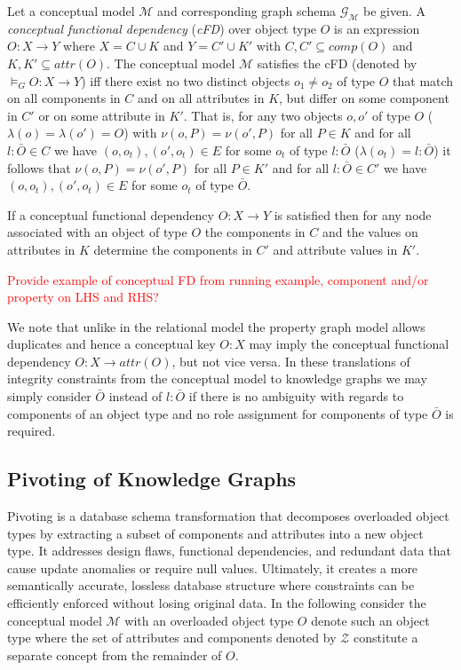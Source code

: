 \documentclass[sigconf]{acmart}
\begin{document}
\begin{definition}\label{def:cFD}
	 Let a conceptual model $\mathcal{M}$ and corresponding graph schema $\mathcal{G}_\mathcal{M}$ be given. A \emph{conceptual functional dependency} (\emph{cFD}) over object type $O$ is an expression $O : X \rightarrow Y$ where $X = C \cup K$ and $Y = C' \cup K'$ with $C,C'\subseteq comp(O)$ and $K,K'\subseteq attr(O)$. The conceptual model $\mathcal{M}$ satisfies the cFD (denoted by $\models_G O : X \rightarrow Y$) iff there exist no two distinct objects $o_1 \neq o_2$ of type $O$ that match on all components in $C$ and on all attributes in $K$, but differ on some component in $C'$ or on some attribute in $K'$. That is, for any two objects $o,o'$ of type $O$ ($\lambda(o) = \lambda(o') = O$) with $\nu(o,P) = \nu(o',P)$ for all $P \in K$ and for all $l:\bar{O} \in C$ we have $(o, o_t), (o', o_t) \in E$ for some $o_t$ of type $l:\bar{O}$ ($\lambda(o_t) = l:\bar{O}$) it follows that $\nu(o,P) = \nu(o',P)$ for all $P \in K'$ and for all $l:\bar{O} \in C'$ we have $(o, o_t), (o', o_t) \in E$ for some $o_t$ of type $\bar{O}$.
\end{definition}

If a conceptual functional dependency $O : X \rightarrow Y$ is satisfied then for any node associated with an object of type $O$ the components in $C$ and the values on attributes in $K$ determine the components in $C'$ and attribute values in $K'$.

\textcolor{red}{Provide example of conceptual FD from running example, component and/or property on LHS and RHS?}

We note that unlike in the relational model the property graph model allows duplicates and hence a conceptual key $O:X$ may imply the conceptual functional dependency $O:X \rightarrow attr(O)$, but not vice versa. In these translations of integrity constraints from the conceptual model to knowledge graphs we may simply consider $\bar{O}$ instead of $l:\bar{O}$ if there is no ambiguity with regards to components of an object type and no role assignment for components of type $\bar{O}$ is required.





\subsection{Pivoting of Knowledge Graphs}

Pivoting is a database schema transformation that decomposes overloaded object types by extracting a subset of components and attributes into a new object type. It addresses design flaws, functional dependencies, and redundant data that cause update anomalies or require null values. Ultimately, it creates a more semantically accurate, lossless database structure where constraints can be efficiently enforced without losing original data. In the following consider the conceptual model $\mathcal{M}$ with an overloaded object type $O$ denote such an object type where the set of attributes and components denoted by $\mathcal{Z}$ constitute a separate concept from the remainder of $O$. 
\end{document}

